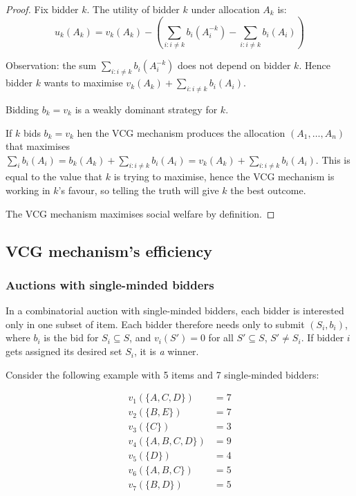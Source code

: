 \begin{proof}
	Fix bidder $k$. The utility of bidder $k$ under allocation
	$A_k$ is:
	\begin{equation*}
		u_k(A_k) = v_k(A_k) - \left( \sum_{i: i \neq k}
		b_i(A_i^{-k}) - \sum_{i: i \neq k} b_i(A_i) \right)
	\end{equation*}

	Observation: the sum $\sum_{i: i \neq k} b_i(A_i^{-k})$ does not depend on
	bidder $k$. Hence bidder $k$ wants to maximise $v_k(A_k) + \sum_{i: i \neq
	k} b_i(A_i)$.

	\begin{claim}
		Bidding $b_k = v_k$ is a weakly dominant strategy for $k$.
	\end{claim}

	\begin{subproof}
		If $k$ bids $b_k = v_k$ hen the VCG mechanism produces the allocation
		$(A_1, \ldots, A_n)$ that maximises $\sum_i b_i(A_i) = b_k(A_k) +
		\sum_{i: i \neq k} b_i(A_i) = v_k(A_k) + \sum_{i: i \neq k} b_i(A_i)$.
		This is equal to the value that $k$ is trying to maximise, hence the
		VCG mechanism is working in $k$'s favour, so telling the truth will
		give $k$ the best outcome.
	\end{subproof}

	The VCG mechanism maximises social welfare by definition.
\end{proof}

\subsection{VCG mechanism's efficiency}

\subsubsection{Auctions with single-minded bidders}

In a combinatorial auction with single-minded bidders, each bidder is
interested only in one subset of item. Each bidder therefore needs only to
submit $(S_i, b_i)$, where $b_i$ is the bid for $S_i \subseteq S$, and $v_i(S')
= 0$ for all $S' \subseteq S$, $S' \neq S_i$. If bidder $i$ gets assigned its
desired set $S_i$, it is \emph{a} winner.

Consider the following example with 5 items and 7 single-minded bidders:

\begin{equation*}
	\begin{split}
		v_1(\{A,C,D\})   & = 7 \\
		v_2(\{B,E\})     & = 7 \\
		v_3(\{C\})       & = 3 \\
		v_4(\{A,B,C,D\}) & = 9 \\
		v_5(\{D\})       & = 4 \\
		v_6(\{A,B,C\})   & = 5 \\
		v_7(\{B,D\})     & = 5 \\
	\end{split}
\end{equation*}

